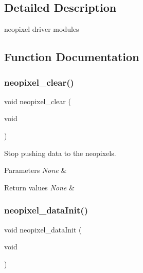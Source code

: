 \subsection{Detailed Description}
neopixel driver modules 



\subsection{Function Documentation}
\mbox{\label{group___neo_pixel_ga8e3cfef785ce221672f825f8785c25b8}} 
\subsubsection{\texorpdfstring{neopixel\+\_\+clear()}{neopixel\_clear()}}
{\footnotesize\ttfamily void neopixel\+\_\+clear (\begin{DoxyParamCaption}\item[{void}]{ }\end{DoxyParamCaption})}



Stop pushing data to the neopixels. 


\begin{DoxyParams}{Parameters}
{\em None} & \\
\hline
\end{DoxyParams}

\begin{DoxyRetVals}{Return values}
{\em None} & \\
\hline
\end{DoxyRetVals}
\mbox{\label{group___neo_pixel_ga79e34feddcfb2c45ae218166c84bdff4}} 
\subsubsection{\texorpdfstring{neopixel\+\_\+data\+Init()}{neopixel\_dataInit()}}
{\footnotesize\ttfamily void neopixel\+\_\+data\+Init (\begin{DoxyParamCaption}\item[{void}]{ }\end{DoxyParamCaption})}



